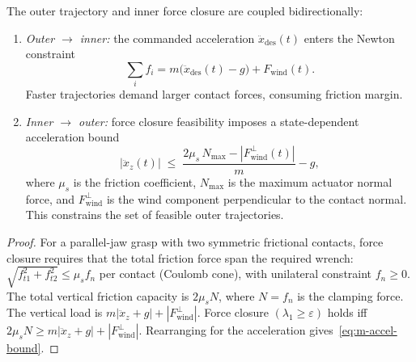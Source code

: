 \begin{theorem}\label{thm:m-bilevel}
The outer trajectory and inner force closure are coupled
bidirectionally:
\begin{enumerate}[label=(\roman*),nosep]
  \item \emph{Outer $\to$ inner:} the commanded acceleration
  $\ddot{x}_\mathrm{des}(t)$ enters the Newton constraint
  \begin{equation}\label{eq:m-newton}
    \sum_i f_i = m\bigl(\ddot{x}_\mathrm{des}(t) - g\bigr)
    + F_\mathrm{wind}(t).
  \end{equation}
  Faster trajectories demand larger contact forces, consuming
  friction margin.
  \item \emph{Inner $\to$ outer:} force closure feasibility imposes
  a state-dependent acceleration bound
  \begin{equation}\label{eq:m-accel-bound}
    |\ddot{x}_z(t)|
    \;\leq\;
    \frac{2\mu_s\, N_\mathrm{max} - |F_\mathrm{wind}^\perp(t)|}{m}
    - g,
  \end{equation}
  where $\mu_s$ is the friction coefficient, $N_\mathrm{max}$ is
  the maximum actuator normal force, and $F_\mathrm{wind}^\perp$
  is the wind component perpendicular to the contact normal.
  This constrains the set of feasible outer trajectories.
\end{enumerate}
\end{theorem}

\begin{proof}
For a parallel-jaw grasp with two symmetric frictional contacts,
force closure requires that the total friction force span the
required wrench:
$\sqrt{f_{t1}^2 + f_{t2}^2} \leq \mu_s f_n$ per contact
(Coulomb cone), with unilateral constraint $f_n \geq 0$.
The total vertical friction capacity is $2\mu_s N$, where
$N = f_n$ is the clamping force.  The vertical load is
$m|\ddot{x}_z + g| + |F_\mathrm{wind}^\perp|$.  Force closure
$(\lambda_1 \geq \varepsilon)$ holds iff
$2\mu_s N \geq m|\ddot{x}_z + g| + |F_\mathrm{wind}^\perp|$.
Rearranging for the acceleration gives~\eqref{eq:m-accel-bound}.
\end{proof}

